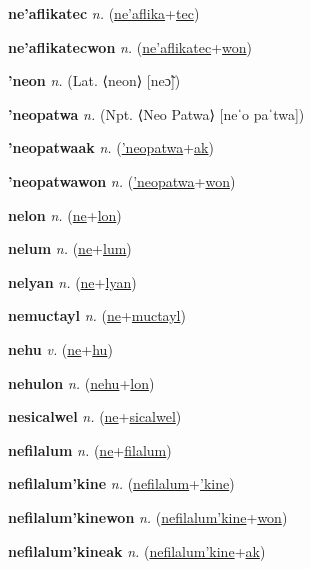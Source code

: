 \textbf{\hypertarget{ne'aflikatec}{ne'aflikatec}} \textit{n.} (\hyperlink{ne'aflika}{ne'aflika}+\allowbreak \hyperlink{tec}{tec})


\textbf{\hypertarget{ne'aflikatecwon}{ne'aflikatecwon}} \textit{n.} (\hyperlink{ne'aflikatec}{ne'aflikatec}+\allowbreak \hyperlink{won}{won})


\textbf{\hypertarget{'neon}{'neon}} \textit{n.} (Lat. ⟨neon⟩ [neɔ̃])


\textbf{\hypertarget{'neopatwa}{'neopatwa}} \textit{n.} (Npt. ⟨Neo Patwa⟩ [neˈo paˈtwa])


\textbf{\hypertarget{'neopatwaak}{'neopatwaak}} \textit{n.} (\hyperlink{'neopatwa}{'neopatwa}+\allowbreak \hyperlink{ak}{ak})


\textbf{\hypertarget{'neopatwawon}{'neopatwawon}} \textit{n.} (\hyperlink{'neopatwa}{'neopatwa}+\allowbreak \hyperlink{won}{won})


\textbf{\hypertarget{nelon}{nelon}} \textit{n.} (\hyperlink{ne}{ne}+\allowbreak \hyperlink{lon}{lon})


\textbf{\hypertarget{nelum}{nelum}} \textit{n.} (\hyperlink{ne}{ne}+\allowbreak \hyperlink{lum}{lum})


\textbf{\hypertarget{nelyan}{nelyan}} \textit{n.} (\hyperlink{ne}{ne}+\allowbreak \hyperlink{lyan}{lyan})


\textbf{\hypertarget{nemuctayl}{nemuctayl}} \textit{n.} (\hyperlink{ne}{ne}+\allowbreak \hyperlink{muctayl}{muctayl})


\textbf{\hypertarget{nehu}{nehu}} \textit{v.} (\hyperlink{ne}{ne}+\allowbreak \hyperlink{hu}{hu})


\textbf{\hypertarget{nehulon}{nehulon}} \textit{n.} (\hyperlink{nehu}{nehu}+\allowbreak \hyperlink{lon}{lon})


\textbf{\hypertarget{nesicalwel}{nesicalwel}} \textit{n.} (\hyperlink{ne}{ne}+\allowbreak \hyperlink{sicalwel}{sicalwel})


\textbf{\hypertarget{nefilalum}{nefilalum}} \textit{n.} (\hyperlink{ne}{ne}+\allowbreak \hyperlink{filalum}{filalum})


\textbf{\hypertarget{nefilalum'kine}{nefilalum'kine}} \textit{n.} (\hyperlink{nefilalum}{nefilalum}+\allowbreak \hyperlink{'kine}{'kine})


\textbf{\hypertarget{nefilalum'kinewon}{nefilalum'kinewon}} \textit{n.} (\hyperlink{nefilalum'kine}{nefilalum'kine}+\allowbreak \hyperlink{won}{won})


\textbf{\hypertarget{nefilalum'kineak}{nefilalum'kineak}} \textit{n.} (\hyperlink{nefilalum'kine}{nefilalum'kine}+\allowbreak \hyperlink{ak}{ak})


